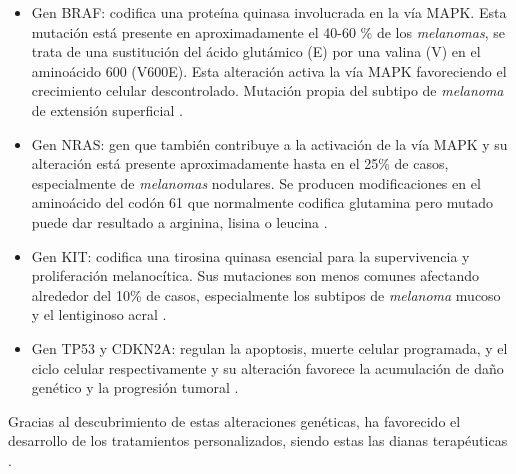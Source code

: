 \begin{itemize}
    \item Gen BRAF: codifica una proteína quinasa involucrada en la vía MAPK. Esta mutación está presente en aproximadamente el 40-60 \% de los \textit{melanomas}, se trata de una sustitución del ácido glutámico (E) por una valina (V) en el aminoácido 600 (V600E). Esta alteración activa la vía MAPK favoreciendo el crecimiento celular descontrolado. Mutación propia del subtipo de \textit{melanoma} de extensión superficial \cite{MutacionesKITNRAS2015}.
    \item  Gen NRAS: gen que también contribuye a la activación de la vía MAPK y su alteración está presente aproximadamente hasta en el 25\% de casos, especialmente de \textit{melanomas} nodulares. Se producen modificaciones en el aminoácido del codón 61 que normalmente codifica glutamina pero mutado puede dar resultado a arginina, lisina o leucina \cite{MutacionesKITNRAS2015}.
    \item Gen KIT: codifica  una tirosina quinasa esencial para la supervivencia y proliferación melanocítica. Sus mutaciones son menos comunes afectando alrededor del 10\% de casos, especialmente los subtipos de \textit{melanoma} mucoso y el lentiginoso acral \cite{MutacionesKITNRAS2015}.
    \item Gen TP53 y CDKN2A: regulan la apoptosis, muerte celular programada, y el ciclo celular respectivamente y su alteración favorece la acumulación de daño genético y la progresión tumoral \cite{Mutaciones_CDNK2A}.
\end{itemize}
 
Gracias al descubrimiento de estas alteraciones genéticas, ha favorecido el desarrollo de los tratamientos personalizados, siendo estas las dianas terapéuticas \cite{MutacionesKITNRAS2015}.

